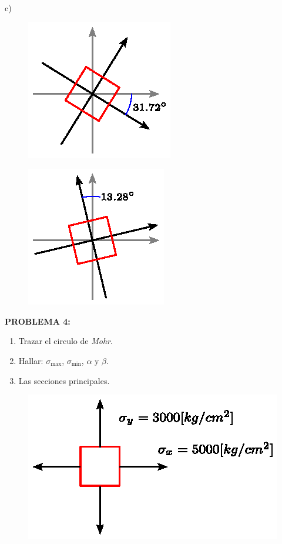 \documentclass[letter,10pt,twoside]{article}
\begin{document}
c) 

\begin{figure}[H]
\centering
\includegraphics[scale=1.6]{resources/f32.eps}
\end{figure}

\begin{figure}[H]
\centering
\includegraphics[scale=1.6]{resources/f33.eps}
\end{figure}

\newpage

\colorbox{blue!25}{\textbf{PROBLEMA 4:}}

\begin{enumerate}[label=\alph*)]
    \item Trazar el circulo de \emph{Mohr}.
    \item Hallar: $\sigma_{\text{max}}$, $\sigma_{\text{min}}$, $\alpha$ y
        $\beta$.
    \item Las secciones principales.
\end{enumerate}

\begin{figure}[H]
\centering
\includegraphics[scale=1.2]{resources/f40.eps}
\end{figure}
\end{document}
